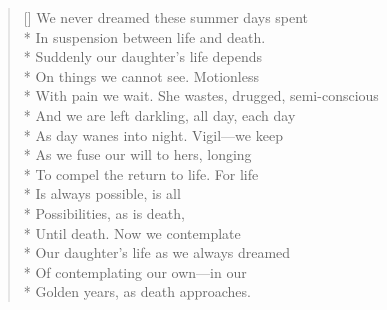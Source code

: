 \label{ch:as_death_approaches}
\settowidth{\versewidth}{With pain we wait.  She wastes, drugged, semi-conscious}
\begin{verse}[\versewidth]
We never dreamed these summer days spent\\*
In suspension between life and death.\\*
Suddenly our daughter's life depends\\*
On things we cannot see.   Motionless\\*
With pain we wait.  She wastes, drugged, semi-conscious\\*
And we are left darkling, all day, each day\\*
As day wanes into night. Vigil---we keep\\*
As we fuse our will to hers, longing\\*
To compel the return to life.  For life\\*
Is always possible, is all \\*
Possibilities, as is death, \\*
Until death. Now we contemplate\\*
Our daughter's life as we always dreamed\\*
Of contemplating our own---in our\\*
Golden years, as death approaches.
\end{verse}
